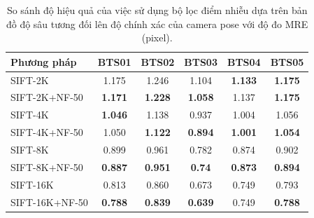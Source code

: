     \begin{table}[ht]
        \centering
        \footnotesize
        \begin{tabular}{|l|c|c|c|c|c|}
        \hline
        \textbf{Phương pháp} & \textbf{BTS01} & \textbf{BTS02} & \textbf{BTS03} & \textbf{BTS04} & \textbf{BTS05} \\
        \hline
        SIFT-2K & 1.175 & 1.246 & 1.104 & \textbf{1.133} & \textbf{1.175} \\
        SIFT-2K+NF-50 & \textbf{1.171} & \textbf{1.228} & \textbf{1.058} & 1.137 & \textbf{1.175}\\
        \hline
        SIFT-4K & \textbf{1.046} & 1.138 & 0.937 & 1.004 & 1.056 \\
        SIFT-4K+NF-50 & 1.050 & \textbf{1.122} & \textbf{0.894} & \textbf{1.001} & \textbf{1.054} \\
        \hline
        SIFT-8K & 0.899 & 0.961 & 0.782 & 0.874 & 0.902 \\
        SIFT-8K+NF-50 & \textbf{0.887} & \textbf{0.951} & \textbf{0.74} & \textbf{0.873} & \textbf{0.894} \\
        \hline
        SIFT-16K & 0.813 & 0.860 & 0.673 & 0.749 & 0.793 \\
        SIFT-16K+NF-50 & \textbf{0.788} & \textbf{0.839} & \textbf{0.639} & 0.749 & \textbf{0.788} \\
        \hline
        \end{tabular}
        \caption{So sánh độ hiệu quả của việc sử dụng bộ lọc điểm nhiễu dựa trên bản đồ độ sâu tương đối lên độ chính xác của camera pose với độ đo MRE (pixel).}
        \label{tab:sift_comparison}
    \end{table}

    
    	   	
